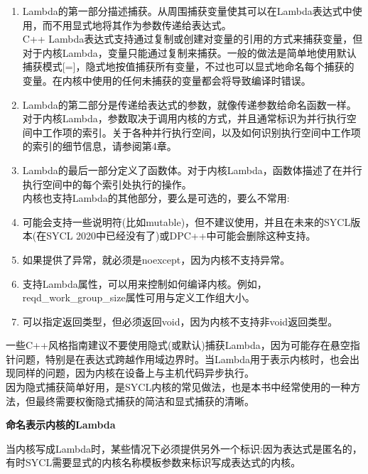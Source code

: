 \begin{enumerate}
	\item Lambda的第一部分描述捕获。从周围捕获变量使其可以在Lambda表达式中使用，而不用显式地将其作为参数传递给表达式。\\
	C++ Lambda表达式支持通过复制或创建对变量的引用的方式来捕获变量，但对于内核Lambda，变量只能通过复制来捕获。一般的做法是简单地使用默认捕获模式[=]，隐式地按值捕获所有变量，不过也可以显式地命名每个捕获的变量。在内核中使用的任何未捕获的变量都会将导致编译时错误。
	\item Lambda的第二部分是传递给表达式的参数，就像传递参数给命名函数一样。\\
	对于内核Lambda，参数取决于调用内核的方式，并且通常标识为并行执行空间中工作项的索引。关于各种并行执行空间，以及如何识别执行空间中工作项的索引的细节信息，请参阅第4章。
	\item Lambda的最后一部分定义了函数体。对于内核Lambda，函数体描述了在并行执行空间中的每个索引处执行的操作。\\
	内核也支持Lambda的其他部分，要么是可选的，要么不常用:
	\item 可能会支持一些说明符(比如mutable)，但不建议使用，并且在未来的SYCL版本(在SYCL 2020中已经没有了)或DPC++中可能会删除这种支持。
	\item 如果提供了异常，就必须是noexcept，因为内核不支持异常。
	\item 支持Lambda属性，可以用来控制如何编译内核。例如，reqd\_work\_group\_size属性可用与定义工作组大小。
	\item 可以指定返回类型，但必须返回void，因为内核不支持非void返回类型。
\end{enumerate}

\begin{tcolorbox}[colback=blue!5!white,colframe=blue!75!black, title=Lambda:隐式捕获还是显式捕获?]
一些C++风格指南建议不要使用隐式(或默认)捕获Lambda，因为可能存在悬空指针问题，特别是在表达式跨越作用域边界时。当Lambda用于表示内核时，也会出现同样的问题，因为内核在设备上与主机代码异步执行。\\

因为隐式捕获简单好用，是SYCL内核的常见做法，也是本书中经常使用的一种方法，但最终需要权衡隐式捕获的简洁和显式捕获的清晰。
\end{tcolorbox}

\hspace*{\fill} \par %
\textbf{命名表示内核的Lambda}

当内核写成Lambda时，某些情况下必须提供另外一个标识:因为表达式是匿名的，有时SYCL需要显式的内核名称模板参数来标识写成表达式的内核。\par

